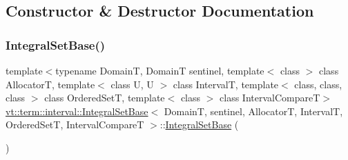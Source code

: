 \subsection{Constructor \& Destructor Documentation}
\mbox{\label{structvt_1_1term_1_1interval_1_1_integral_set_base_a0826331831d6c87ec6b81a9264f98e12}} 
\subsubsection{\texorpdfstring{Integral\+Set\+Base()}{IntegralSetBase()}\hspace{0.1cm}{\footnotesize\ttfamily [1/4]}}
{\footnotesize\ttfamily template$<$typename DomainT, DomainT sentinel, template$<$ class $>$ class AllocatorT, template$<$ class U, U $>$ class IntervalT, template$<$ class, class, class $>$ class Ordered\+SetT, template$<$ class $>$ class Interval\+CompareT$>$ \\
\hyperlink{structvt_1_1term_1_1interval_1_1_integral_set_base}{vt\+::term\+::interval\+::\+Integral\+Set\+Base}$<$ DomainT, sentinel, AllocatorT, IntervalT, Ordered\+SetT, Interval\+CompareT $>$\+::\hyperlink{structvt_1_1term_1_1interval_1_1_integral_set_base}{Integral\+Set\+Base} (\begin{DoxyParamCaption}{ }\end{DoxyParamCaption})\hspace{0.3cm}{\ttfamily [inline]}}

\mbox{\label{structvt_1_1term_1_1interval_1_1_integral_set_base_a8584b495b7b88baa0eed6012993dd562}} 
